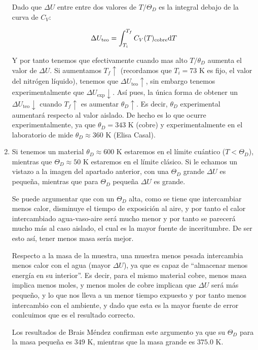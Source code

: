 \begin{enumerate}[label=\alph*)]
	      Dado que $\Delta U$ entre entre dos valores de $T/\Theta_D$ es la integral debajo de la curva de $C_V$:

	      \[
		      \Delta U_{\text{teo}} = \int_{T_i}^{T_f} C_V(T)_{\text{cobre}} \mathrm{d} T
	      \]

	      Y por tanto tenemos que efectivamente cuando mas alto $T/\theta_D$ aumenta el valor de $\Delta U$. Si aumentamos $T_f \uparrow$ (recordamos que $T_i=73$ K es fijo, el valor del nitrógen líquido), tenemos que $\Delta U_{\text{teo}} \uparrow$, sin embargo tenemos experimentalmente que $\Delta U_{\exp} \downarrow$. Así pues, la única forma de obtener un $\Delta U_{\text{teo}} \downarrow$ cuando $T_f \uparrow$ es aumentar $\theta_D \uparrow$. Es decir, $\theta_D$ experimental aumentará respecto al valor aislado. De hecho es lo que ocurre experimentalmente, ya que $\theta_D=343$ K (cobre) y experimentalmente en el laboratorio de mide $\theta_D \approx 360$ K (Elisa Casal).

	\item Si tenemos un material $\theta_D\approx 600$ K estaremos en el límite cuántico ($T<\Theta_D$), mientras que $\Theta_D \approx 50$ K estaremos en el límite clásico. Si le echamos un vistazo a la imagen del apartado anterior, con una $\Theta_D$ grande $\Delta U$ es pequeña, mientras que para $\Theta_D $ pequeña $\Delta U$ es grande.
	
	Se puede argumentar que con un $\Theta_D$ alta, como se tiene que intercambiar menos calor, disminuye el tiempo de exposición al aire, y por tanto el calor intercambiado agua-vaso-aire será mucho menor y por tanto se parecerá mucho más al caso aislado, el cual es la mayor fuente de inceritumbre. De ser esto así, tener menos masa sería mejor.

	Respecto a la masa de la muestra, una muestra menos pesada intercambia menos calor con el agua (mayor $\Delta U$), ya que es capaz de ``almacenar menos energía en su interior''. Es decir, para el mismo material cobre, menos masa implica menos moles, y menos moles de cobre implican que $\Delta U$ será más pequeño, y lo que nos lleva a un menor tiempo expuesto y por tanto menos intercambio con el ambiente, y dado que esta es la mayor fuente de error conlcuimos que es el resultado correcto.
	
	Los resultados de Brais Méndez confirman este argumento ya que su $\Theta_D$ para la masa pequeña es $349$ K, mientras que la masa grande es $375.0$ K. 
	



\end{enumerate}
